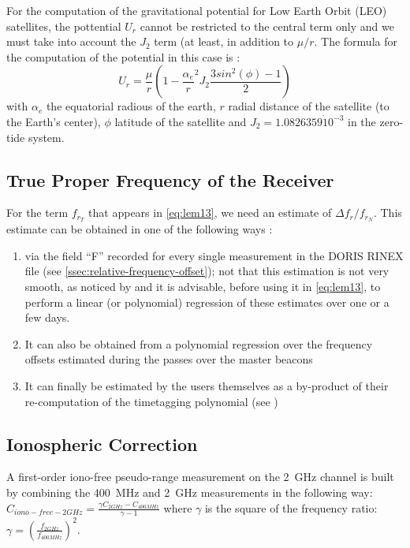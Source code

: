 For the computation of the gravitational potential for Low Earth Orbit (LEO) satellites, 
the pottential \(U_r\) cannot be restricted to the central term only and we must 
take into account the \(J_2\) term (at least, in addition to \(\mu / r\). The formula 
for the computation of the potential in this case is \cite{lemoine-2016}:
\begin{equation}
    U_r = \frac{\mu}{r} (1-{\frac{\alpha_e}{r}}^2 J_2 \frac{3 sin^2(\phi) - 1}{2})
\end{equation}
with \(\alpha_e\) the equatorial radious of the earth, \(r\) radial distance of the 
satellite (to the Earth's center), \(\phi\) latitude of the satellite and \(J_2 = 1.0826359 \dot 10^{-3}\) 
in the zero-tide system.

\subsection{True Proper Frequency of the Receiver}
\label{ssec:true-proprtfrequency-of-the-receiver}

For the term \(f_{r_T}\) that appears in \ref{eq:lem13}, we need an estimate of \(\Delta f_{r} / f_{r_N}\). 
This estimate can be obtained in one of the following ways \cite{lemoine-2016}:
\begin{enumerate}
    \item via the field ``F'' recorded for every single measurement in the DORIS 
    RINEX file (see \ref{ssec:relative-frequency-offset}); not that this estimation 
    is not very smooth, as noticed by \cite{GAO2015} and it is advisable, before 
    using it in \ref{eq:lem13}, to perform a linear (or polynomial) regression of 
    these estimates over one or a few days.

    \item It can also be obtained from a polynomial regression
    over the frequency oﬀsets estimated during the passes
    over the master beacons

    \item It can ﬁnally be estimated by the users themselves as a
    by-product of their re-computation of the timetagging polynomial (see \cite{MERCIER2010})
\end{enumerate}

\subsection{Ionospheric Correction}
A ﬁrst-order iono-free pseudo-range measurement on the \SI{2}{\GHz} channel is built by combining
the \SI{400}{\MHz} and \SI{2}{\GHz} measurements in the following way:
\(C_{iono-free-2GHz} = \frac{\gamma C_{2GHz} - C_{400MHz}}{\gamma - 1}\)
where \(\gamma\) is the square of the frequency ratio: 
\(\gamma = {(\frac{f_{2GHz}}{f_{400MHz}})}^2\).


